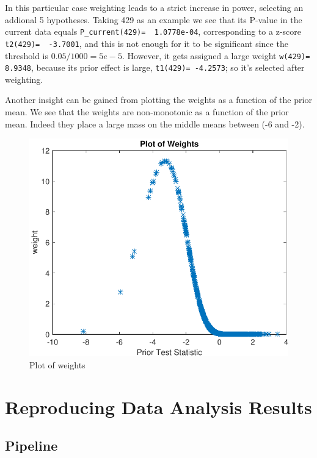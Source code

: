 \documentclass[english,11pt]{article} %
\begin{document}
In this particular case weighting leads to a strict increase in power, selecting an addional 5 hypotheses. Taking 429 as an example we see that its P-value in the current data equals \verb+P_current(429)=  1.0778e-04+, corresponding to a z-score \verb+t2(429)=  -3.7001+, and this is not enough for it to be significant since the threshold is $0.05/1000=5e-5$. However, it gets assigned a large weight  \verb+w(429)=  8.9348+, because its prior  effect is large, \verb+t1(429)= -4.2573+; so it's selected after weighting.

Another insight can be gained from plotting the weights as a function of the prior mean. We see that the weights are non-monotonic as a function of the prior mean. Indeed they place a large mass on the middle means between (-6 and -2).


\begin{figure}[ht!]
\centering
\includegraphics[scale=0.6]{"../Data/weights"}
\caption{Plot of weights}
\label{scatter_prior_current}
\end{figure}

\section{Reproducing Data Analysis Results}
\label{repro}

\subsection{Pipeline}
\end{document}
